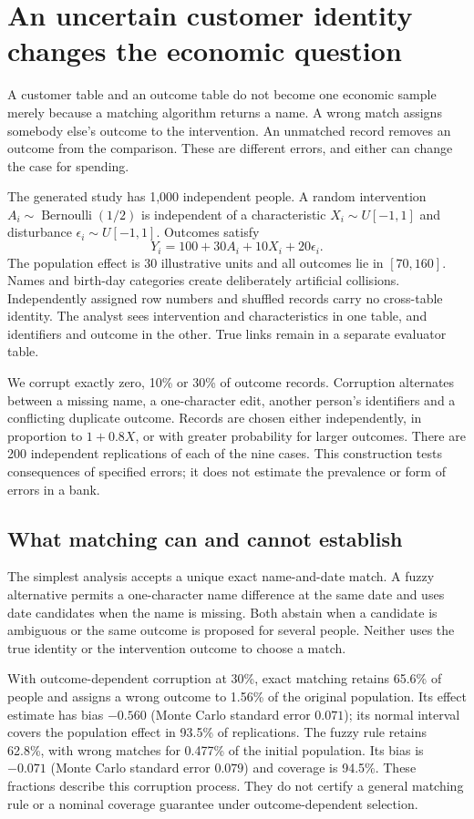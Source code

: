 \chapter{An uncertain customer identity changes the economic question}
\label{gap29:observation}
A customer table and an outcome table do not become one economic sample merely
because a matching algorithm returns a name. A wrong match assigns somebody
else's outcome to the intervention. An unmatched record removes an outcome
from the comparison. These are different errors, and either can change the
case for spending.

The generated study has 1,000 independent people. A random intervention
$A_i\sim\operatorname{Bernoulli}(1/2)$ is independent of a characteristic
$X_i\sim U[-1,1]$ and disturbance $\epsilon_i\sim U[-1,1]$. Outcomes satisfy
\[
 Y_i=100+30A_i+10X_i+20\epsilon_i.
\]
The population effect is 30 illustrative units and all outcomes lie in
$[70,160]$. Names and birth-day categories create deliberately artificial
collisions. Independently assigned row numbers and shuffled records carry
no cross-table identity. The analyst sees intervention and characteristics
in one table, and identifiers and outcome in the other. True links remain
in a separate evaluator table.

We corrupt exactly zero, 10\% or 30\% of outcome records. Corruption alternates
between a missing name, a one-character edit, another person's identifiers
and a conflicting duplicate outcome. Records are chosen either independently,
in proportion to $1+0.8X$, or with greater probability for larger outcomes.
There are 200 independent replications of each of the nine cases.
This construction tests consequences of specified errors; it does not
estimate the prevalence or form of errors in a bank.

\section{What matching can and cannot establish}
The simplest analysis accepts a unique exact name-and-date match. A fuzzy
alternative permits a one-character name difference at the same date and
uses date candidates when the name is missing. Both abstain when a candidate
is ambiguous or the same outcome is proposed for several people. Neither
uses the true identity or the intervention outcome to choose a match.

With outcome-dependent corruption at 30\%, exact matching retains 65.6\%
of people and assigns a wrong outcome to 1.56\% of the original population.
Its effect estimate has bias $-0.560$ (Monte Carlo standard error $0.071$);
its normal interval covers the population effect in 93.5\% of replications.
The fuzzy rule retains 62.8\%, with wrong matches for 0.477\% of the initial
population. Its bias is $-0.071$ (Monte Carlo standard error $0.079$) and
coverage is 94.5\%. These fractions describe this corruption process.
They do not certify a general matching rule or a nominal coverage guarantee
under outcome-dependent selection.

